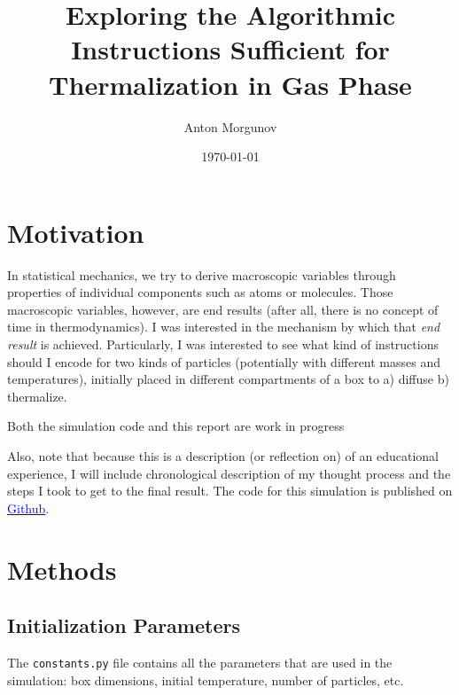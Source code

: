 \documentclass[10pt]{article}
\begin{document}
\title{Exploring the Algorithmic Instructions Sufficient for Thermalization in Gas Phase}
\author{Anton Morgunov}
\date{\today}

\maketitle



\section{Motivation}
In statistical mechanics, we try to derive macroscopic variables through properties of individual components such as atoms or molecules. Those macroscopic variables, however, are end results (after all, there is no concept of time in thermodynamics). I was interested in the mechanism by which that \textit{end result} is achieved. Particularly, I was interested to see what kind of instructions should I encode for two kinds of particles (potentially with different masses and temperatures), initially placed in different compartments of a box to a) diffuse b) thermalize. 

\begin{warningbox}
    Both the simulation code and this report are work in progress
\end{warningbox}

Also, note that because this is a description (or reflection on) of an educational experience, I will include chronological description of my thought process and the steps I took to get to the final result. The code for this simulation is published on \href{https://github.com/anmorgunov/statmech-simulation}{\textcolor{blue}{Github}}. 

\section{Methods}
\subsection{Initialization Parameters}
The \texttt{constants.py} file contains all the parameters that are used in the simulation: box dimensions, initial temperature, number of particles, etc.
\end{document}
